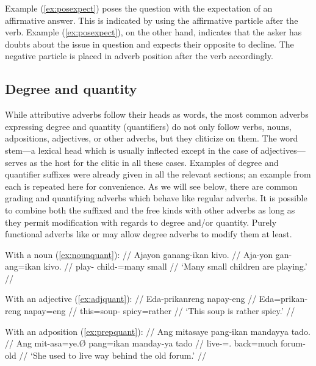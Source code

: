 Example (\ref{ex:posexpect}) poses the question with the expectation of an 
affirmative answer. This is indicated by using the affirmative particle 
 after the verb. Example (\ref{ex:posexpect}), on the other 
hand, indicates that the asker has doubts about the issue in question and 
expects their opposite to decline. The negative particle  is 
placed in adverb position after the verb accordingly.


\subsection{Degree and quantity}

While attributive adverbs follow their heads as words, the most common adverbs 
expressing degree and quantity (quantifiers) do not only follow verbs, nouns, 
adpositions, adjectives, or other adverbs, but they cliticize on them. The word 
stem---a lexical head which is usually inflected except in the case of 
adjectives---serves as the host for the clitic in all these cases. Examples of 
degree and quantifier suffixes were already given in all the relevant sections; 
an example from each is repeated here for convenience. As we will see below, 
there are common grading and quantifying adverbs which behave like regular 
adverbs. It is possible to combine both the suffixed and the free kinds with 
other adverbs as long as they permit modification with regards to degree 
and/or quantity. Purely functional adverbs like  or 
 may allow degree adverbs to modify them at 
least.

\pex
\a\label{ex:nounquant2}\begingl
	\glpreamble With a noun (\ref{ex:nounquant}): //
	\gla Ajayon ganang-ikan kivo. //
	\glb Aja-yon gan-ang=ikan kivo. //
	\glc play-\TsgN{} child-\Aarg{}=many small //
	\glft `Many small children are playing.' //
\endgl

\a\label{ex:adjquant2}\begingl
	\glpreamble With an adjective (\ref{ex:adjquant}): //
	\gla Eda-prikanreng napay-eng //
	\glb Eda=prikan-reng napay=eng //
	\glc this=soup-\AargI{} spicy=rather //
	\glft `This soup is rather spicy.' //
\endgl

\a\label{ex:prepquant2}\begingl
	\glpreamble With an adposition (\ref{ex:prepquant}): //
	\gla Ang mitasaye pang-ikan mandayya tado. //
	\glb Ang mit-asa=ye.Ø pang=ikan manday-ya tado //
	\glc \AgtT{} live-\Hab{}=\TsgF{}.\Top{} back=much forum-\Loc{} old //
	\glft `She used to live way behind the old forum.' //
\endgl

